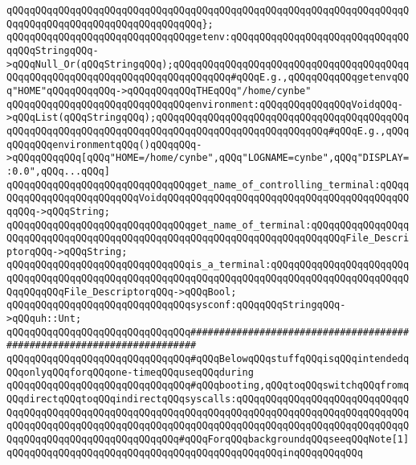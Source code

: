 \verb|qQQqqQQqqQQqqQQqqQQqqQQqqQQqqQQqqQQqqQQqqQQqqQQqqQQqqQQqqQQqqQQqqQQqqQQqqQQqqQQqqQQqqQQqqQQqqQQqqQQqqQQq};|\newline
\newline
\verb|qQQqqQQqqQQqqQQqqQQqqQQqqQQqqQQqgetenv:qQQqqQQqqQQqqQQqqQQqqQQqqQQqqQQqqQQqStringqQQq->qQQqNull_Or(qQQqStringqQQq);qQQqqQQqqQQqqQQqqQQqqQQqqQQqqQQqqQQqqQQqqQQqqQQqqQQqqQQqqQQqqQQqqQQqqQQqqQQqqQQq#qQQqE.g.,qQQqqQQqqQQqgetenvqQQq"HOME"qQQqqQQqqQQq->qQQqqQQqqQQqTHEqQQq"/home/cynbe"|\newline
\verb|qQQqqQQqqQQqqQQqqQQqqQQqqQQqqQQqenvironment:qQQqqQQqqQQqqQQqVoidqQQq->qQQqList(qQQqStringqQQq);qQQqqQQqqQQqqQQqqQQqqQQqqQQqqQQqqQQqqQQqqQQqqQQqqQQqqQQqqQQqqQQqqQQqqQQqqQQqqQQqqQQqqQQqqQQqqQQqqQQq#qQQqE.g.,qQQqqQQqqQQqenvironmentqQQq()qQQqqQQq->qQQqqQQqqQQq[qQQq"HOME=/home/cynbe",qQQq"LOGNAME=cynbe",qQQq"DISPLAY=:0.0",qQQq...qQQq]|\newline
\newline
\verb|qQQqqQQqqQQqqQQqqQQqqQQqqQQqqQQqget_name_of_controlling_terminal:qQQqqQQqqQQqqQQqqQQqqQQqqQQqVoidqQQqqQQqqQQqqQQqqQQqqQQqqQQqqQQqqQQqqQQqqQQqqQQq->qQQqString;|\newline
\verb|qQQqqQQqqQQqqQQqqQQqqQQqqQQqqQQqget_name_of_terminal:qQQqqQQqqQQqqQQqqQQqqQQqqQQqqQQqqQQqqQQqqQQqqQQqqQQqqQQqqQQqqQQqqQQqqQQqqQQqFile_DescriptorqQQq->qQQqString;|\newline
\verb|qQQqqQQqqQQqqQQqqQQqqQQqqQQqqQQqis_a_terminal:qQQqqQQqqQQqqQQqqQQqqQQqqQQqqQQqqQQqqQQqqQQqqQQqqQQqqQQqqQQqqQQqqQQqqQQqqQQqqQQqqQQqqQQqqQQqqQQqqQQqqQQqFile_DescriptorqQQq->qQQqBool;|\newline
\newline
\verb|qQQqqQQqqQQqqQQqqQQqqQQqqQQqqQQqsysconf:qQQqqQQqStringqQQq->qQQquh::Unt;|\newline
\newline
\verb|qQQqqQQqqQQqqQQqqQQqqQQqqQQqqQQq#######################################################################|\newline
\verb|qQQqqQQqqQQqqQQqqQQqqQQqqQQqqQQq#qQQqBelowqQQqstuffqQQqisqQQqintendedqQQqonlyqQQqforqQQqone-timeqQQquseqQQqduring|\newline
\verb|qQQqqQQqqQQqqQQqqQQqqQQqqQQqqQQq#qQQqbooting,qQQqtoqQQqswitchqQQqfromqQQqdirectqQQqtoqQQqindirectqQQqsyscalls:qQQqqQQqqQQqqQQqqQQqqQQqqQQqqQQqqQQqqQQqqQQqqQQqqQQqqQQqqQQqqQQqqQQqqQQqqQQqqQQqqQQqqQQqqQQqqQQqqQQqqQQqqQQqqQQqqQQqqQQqqQQqqQQqqQQqqQQqqQQqqQQqqQQqqQQqqQQqqQQqqQQqqQQqqQQqqQQqqQQqqQQqqQQqqQQqqQQqqQQq#qQQqForqQQqbackgroundqQQqseeqQQqNote[1]qQQqqQQqqQQqqQQqqQQqqQQqqQQqqQQqqQQqqQQqqQQqqQQqinqQQqqQQqqQQq|\newline
